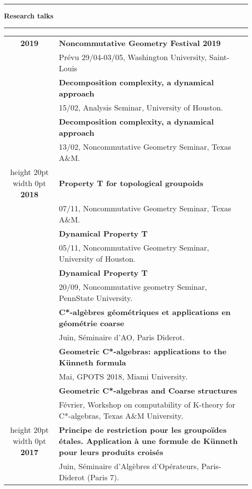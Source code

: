 \documentclass[a4paper,11pt]{article}
\newcommand\espace{\vrule height 20pt width 0pt}
\newcommand{\titre}[1]{%
	\begin{center}
	\bigskip
	\rule{\textwidth}{1pt}
	\par\vspace{0.1cm}
        \textbf{\large #1}
	\par\rule{\textwidth}{1pt}
	\end{center}
	\bigskip
	}
\begin{document}
\newpage
\titre{Research talks }

\begin{tabular}{cp{}}

\textbf{2019} & \textbf{Noncommutative Geometry Festival 2019}\\	
				& Pr\'evu 29/04-03/05, Washington University, Saint-Louis \\ %
				& \textbf{Decomposition complexity, a dynamical approach}\\
				& 15/02, Analysis Seminar, University of Houston. \\ %
				& \textbf{Decomposition complexity, a dynamical approach}\\
				& 13/02, Noncommutative Geometry Seminar, Texas A\&M.  \\ %
				\espace
\textbf{2018} & \textbf{Property T for topological groupoids}\\
				& 07/11, Noncommutative Geometry Seminar, Texas A\&M. \\ %
				& \textbf{Dynamical Property T}\\
				& 05/11, Noncommutative Geometry Seminar, University of Houston. \\ %
				& \textbf{Dynamical Property T}\\
				& 20/09, Noncommutative geometry Seminar, PennState University.\\
				& \textbf{C*-alg\`ebres g\'eom\'etriques et applications en g\'eom\'etrie coarse}\\
				& Juin, S\'eminaire d'AO, Paris Diderot.\\
				& \textbf{Geometric C*-algebras: applications to the K\"unneth formula}\\
				& Mai, GPOTS 2018, Miami University.\\
				& \textbf{Geometric C*-algebras and Coarse structures}\\
				& F\'evrier, Workshop on computability of K-theory for C*-algebras, Texas A\&M University.\\
				\espace	
\textbf{2017} & \textbf{Principe de restriction pour les groupoïdes étales. Application à une formule de Künneth pour leurs produits croisés}\\
				& Juin, Séminaire d'Algèbres d'Opérateurs, Paris-Diderot (Paris 7).\\

\end{tabular}
\end{document}
